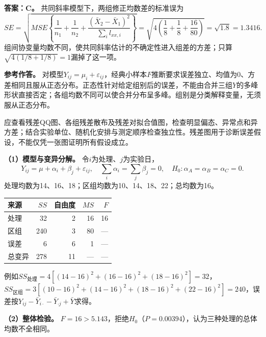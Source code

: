 \textbf{答案：C。} 共同斜率模型下，两组修正均数差的标准误为
\[
SE=\sqrt{MSE\left\{\frac1{n_1}+\frac1{n_2}
+\frac{(\bar X_2-\bar X_1)^2}{\sum_i l_{xx,i}}\right\}}
=\sqrt{4\left(\frac18+\frac18+\frac{16}{80}\right)}
=\sqrt{1.8}=1.3416.
\]
组间协变量均数不同，使共同斜率估计的不确定性进入组差的方差；只算\(\sqrt{4(1/8+1/8)}=1\)漏掉了这一项。
\par\nobreak\smallskip{}

\textbf{参考作答。} 对模型\(Y_{ij}=\mu_i+\varepsilon_{ij}\)，经典小样本\(F\)推断要求误差独立、均值为0、方差相同且服从正态分布。正态性针对给定组别后的误差，不能由合并三组\(Y\)的多峰形状直接否定；各组均数不同可以使合并分布呈多峰。组别是分类解释变量，无须服从正态分布。

应查看残差QQ图、各组残差散布及残差对拟合值图，检查明显偏态、异常点和异方差；结合实验单位、随机化安排与测定顺序检查独立性。残差图用于诊断误差假设，不能仅凭一张图证明所有假设成立。
\par\nobreak\smallskip{}

\textbf{（1）模型与变异分解。} 令\(i\)为处理、\(j\)为实验日，
\[
Y_{ij}=\mu+\alpha_i+\beta_j+\varepsilon_{ij},\quad
\sum_i\alpha_i=\sum_j\beta_j=0,\quad
H_0:\alpha_A=\alpha_B=\alpha_C=0.
\]
处理均数为14、16、18；区组均数为10、14、18、22；总均数为16。
\begin{center}\begin{tabular}{lrrrr}
\toprule 来源&\(SS\)&自由度&\(MS\)&\(F\)\\\midrule
处理&32&2&16&16\\
区组&240&3&80&---\\
误差&6&6&1&---\\
总变异&278&11&---&---\\\bottomrule
\end{tabular}\end{center}
例如\(SS_{\text{处理}}=4[(14-16)^2+(16-16)^2+(18-16)^2]=32\)，\(SS_{\text{区组}}=3[(10-16)^2+(14-16)^2+(18-16)^2+(22-16)^2]=240\)，误差按\(Y_{ij}-\bar Y_{i\cdot}-\bar Y_{\cdot j}+\bar Y\)求得。

\textbf{（2）整体检验。} \(F=16>5.143\)，拒绝\(H_0\)（\(P=0.00394\)），认为三种处理的总体均数不全相同。

